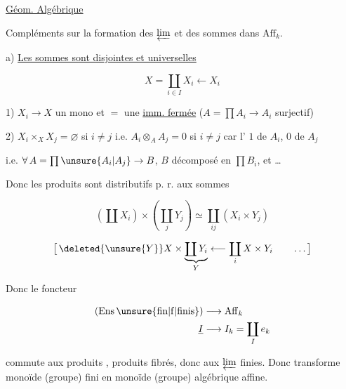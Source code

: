 
\uline{Géom. Algébrique}

Compléments sur la formation des $\varprojlim$ et des sommes dans $\mathrm{Aff}_k$.

a) \uline{Les sommes  sont disjointes et universelles}

\[
X=\coprod_{i\in I}X_i\longleftarrow X_i
\]

1) $X_i\to X$ un mono et $=$ une \uline{imm. fermée} \qquad ($A=\prod A_i\to A_i$ surjectif)

2) $X_i\times_X X_j=\varnothing$ si $i\ne j$ \qquad i.e. $A_i\otimes_A A_j=0$ si $i\ne j$ car l' $1$ de $A_i$, $0$ de $A_j$ 


i.e. $\forall\,A=\prod\unsure{A_i|A_j}\to B$, $B$ décomposé en $\prod B_i$, et \ldots

 Donc les produits  sont distributifs p. r. aux sommes

\[
\left(\coprod X_i\right)\times\left(\coprod_j Y_j\right)\simeq\coprod_{ij}(X_i\times Y_j)
\]

\[
\bigl[\,\deleted{\unsure{Y}}X\times\underbrace{\coprod Y_i}_{Y}\longleftarrow\coprod_i X\times Y_i\qquad\ldots\,\bigr]
\]


Donc le foncteur

\[
\begin{aligned}
(\mathrm{Ens}\,\unsure{\mathrm{fin}|\mathrm f|\mathrm{finis}})&\longrightarrow\mathrm{Aff}_k\\
\underline I&\longrightarrow I_k=\coprod_I e_k
\end{aligned}
\]

commute aux  produits ,   produits fibrés, donc aux $\varprojlim$ finies. Donc transforme monoïde (groupe) fini en monoïde (groupe) algébrique affine.

